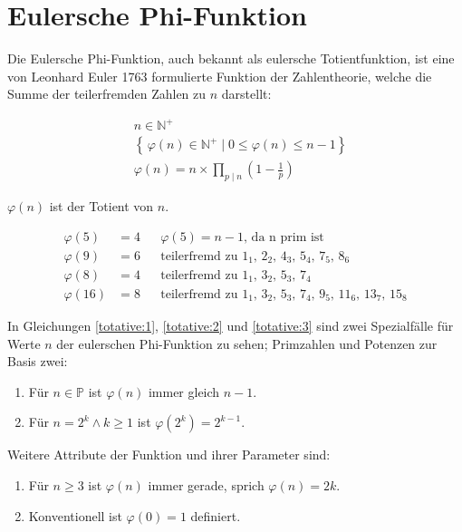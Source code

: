 \section{Eulersche Phi-Funktion}

Die Eulersche Phi-Funktion, auch bekannt als eulersche Totientfunktion, ist eine von Leonhard Euler 1763 formulierte Funktion der Zahlentheorie, welche die Summe der teilerfremden Zahlen zu $n$ darstellt\cite{pacific}:

\begin{equation}
  \begin{aligned}
    &n \in \mathbb{N}^+\\
    &\left\{\,\varphi(n) \in \mathbb{N}^+\mid 0 \le \varphi(n) \le n-1 \right\}\\
    &\varphi(n) = n \times \prod_{p\mid{}n}\left(1-\frac{1}{p}\right)
  \end{aligned}
\end{equation}

$\varphi(n)$ ist der Totient von $n$.

\begin{align}
  \varphi(5)&= 4 && \text{$\varphi(5) = n-1$, da n prim ist}\label{totative:1}\\
  \varphi(9)&= 6 && \text{teilerfremd zu $1_1$, $2_2$, $4_3$, $5_4$, $7_5$, $8_6$}\\
  \varphi(8)&= 4 && \text{teilerfremd zu $1_1$, $3_2$, $5_3$, $7_4$}\label{totative:2}\\ 
  \varphi(16)&= 8 && \text{teilerfremd zu $1_1$, $3_2$, $5_3$, $7_4$, $9_5$, $11_6$, $13_7$, $15_8$}\label{totative:3}
\end{align}

In Gleichungen \eqref{totative:1}, \eqref{totative:2} und \eqref{totative:3} sind zwei Spezialfälle für Werte $n$ der eulerschen Phi-Funktion zu sehen; Primzahlen und Potenzen zur Basis zwei:

\begin{enumerate}
  \item Für $n \in \mathbb{P}$ ist $\varphi(n)$ immer gleich $n-1$.\cite{mw02}
  \item Für $n=2^k \land k \ge 1$ ist $\varphi(2^k)=2^{k-1}$.
\end{enumerate}

Weitere Attribute der Funktion und ihrer Parameter sind:

\begin{enumerate}
  \item Für $n \ge 3$ ist $\varphi(n)$ immer  gerade, sprich $\varphi(n)=2k$.\cite{mw02}
  \item Konventionell ist $\varphi(0)=1$ definiert.\cite{mw02}
\end{enumerate}

